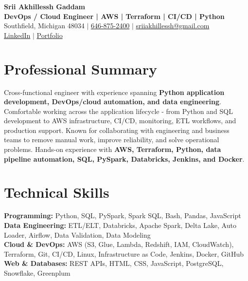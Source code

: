 \documentclass[letterpaper,10pt]{article}
\begin{document}
\fontsize{9.35pt}{10.45pt}\selectfont

\begin{center}
    {\LARGE \textbf{Srii Akhillessh Gaddam}} \\[-1pt]
    \textbf{DevOps / Cloud Engineer | AWS | Terraform | CI/CD | Python} \\[2pt]
    Southfield, Michigan 48034 $|$
    \href{tel:6468752400}{646-875-2400} $|$
    \href{mailto:sriiakhillessh@gmail.com}{sriiakhillessh@gmail.com} \\[1pt]
    \href{https://www.linkedin.com/in/srii-akhiilessh-gaddam-b48668191/}{LinkedIn} $|$
    \href{https://sriiakhillesshg.github.io/portfolio/}{Portfolio}
\end{center}
\vspace{-8pt}

\section{Professional Summary}
\small{Cross-functional engineer with experience spanning \textbf{Python application development, DevOps/cloud automation, and data engineering}. Comfortable working across the application lifecycle - from Python and SQL development to AWS infrastructure, CI/CD, monitoring, ETL workflows, and production support. Known for collaborating with engineering and business teams to remove manual work, improve reliability, and solve operational problems. Hands-on experience with \textbf{AWS, Terraform, Python, data pipeline automation, SQL, PySpark, Databricks, Jenkins, and Docker}.}

\section{Technical Skills}
\small{
\textbf{Programming:} Python, SQL, PySpark, Spark SQL, Bash, Pandas, JavaScript \\
\textbf{Data Engineering:} ETL/ELT, Databricks, Apache Spark, Delta Lake, Auto Loader, Airflow, Data Validation, Data Modeling \\
\textbf{Cloud \& DevOps:} AWS (S3, Glue, Lambda, Redshift, IAM, CloudWatch), Terraform, Git, CI/CD, Linux, Infrastructure as Code, Jenkins, Docker, GitHub \\
\textbf{Web \& Databases:} REST APIs, HTML, CSS, JavaScript, PostgreSQL, Snowflake, Greenplum
}
\end{document}
